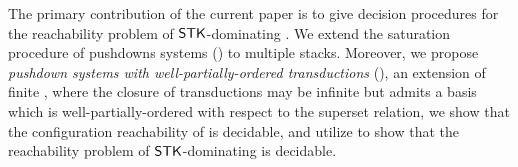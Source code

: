 The primary contribution of the current paper is to give decision procedures for the reachability problem of $\mathsf{STK}$-dominating {\AMASS}. We extend the saturation procedure of pushdowns systems (\PDS) to multiple stacks.  Moreover, we propose \emph{pushdown systems with well-partially-ordered transductions} (\WOTrPDS), an extension of finite \TrPDS, where the closure of transductions may be infinite but admits a basis which is well-partially-ordered with respect to the superset relation, we show that the configuration reachability of {\WOTrPDS} is decidable, and utilize {\WOTrPDS} to show that the reachability problem of $\mathsf{STK}$-dominating {\AMASS} is decidable.

	
